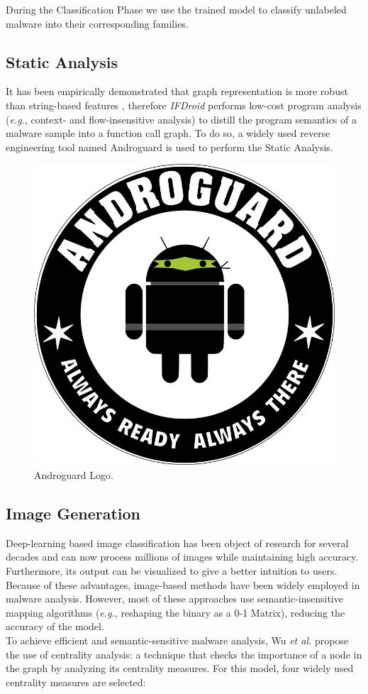 \noindent During the Classification Phase we use the trained model to classify unlabeled malware into their corresponding families.

\subsection{Static Analysis}
It has been empirically demonstrated that graph representation is more robust than string-based features \cite{fan2018android}, therefore \textit{IFDroid} performs low-cost program analysis (\textit{e.g.}, context- and flow-insensitive analysis) to distill the program semantics of a malware sample into a function call graph. To do so, a widely used reverse engineering tool named Androguard \cite{desnos2011androguard} is used to perform the Static Analysis.

\begin{figure}[H]
    \centering
    \includegraphics[width=0.4\linewidth]{Images/AndroguardLogo.png}
    \caption{Androguard Logo.}
    \label{fig:AndroLogo}
\end{figure}

\subsection{Image Generation}

Deep-learning based image classification has been object of research for several decades and can now process millions of images while maintaining high accuracy. Furthermore, its output can be visualized to give a better intuition to users. Because of these advantages, image-based methods have been widely employed in malware analysis. However, most of these approaches \cite{nataraj2011malware} use semantic-insensitive mapping algorithms (\textit{e.g.}, reshaping the binary as a 0-1 Matrix), reducing the accuracy of the model. \\
To achieve efficient and semantic-sensitive malware analysis, Wu \textit{et al.} propose the use of centrality analysis: a technique that checks the importance of a node in the graph by analyzing its centrality measures. For this model, four widely used centrality measures are selected:

